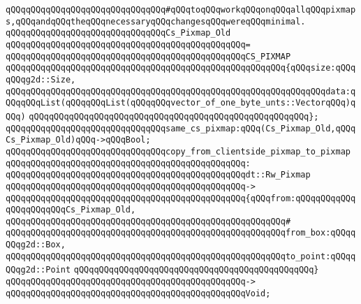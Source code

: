 \verb|qQQqqQQqqQQqqQQqqQQqqQQqqQQqqQQq#qQQqtoqQQqworkqQQqonqQQqallqQQqpixmaps,qQQqandqQQqtheqQQqnecessaryqQQqchangesqQQqwereqQQqminimal.|\newline
\newline
\newline
\verb|qQQqqQQqqQQqqQQqqQQqqQQqqQQqqQQqCs_Pixmap_Old|\newline
\verb|qQQqqQQqqQQqqQQqqQQqqQQqqQQqqQQqqQQqqQQqqQQqqQQq=|\newline
\verb|qQQqqQQqqQQqqQQqqQQqqQQqqQQqqQQqqQQqqQQqqQQqqQQqCS_PIXMAP|\newline
\verb|qQQqqQQqqQQqqQQqqQQqqQQqqQQqqQQqqQQqqQQqqQQqqQQqqQQqqQQq{qQQqsize:qQQqqQQqg2d::Size,|\newline
\verb|qQQqqQQqqQQqqQQqqQQqqQQqqQQqqQQqqQQqqQQqqQQqqQQqqQQqqQQqqQQqqQQqdata:qQQqqQQqList(qQQqqQQqList(qQQqqQQqvector_of_one_byte_unts::VectorqQQq)qQQq)|\newline
\verb|qQQqqQQqqQQqqQQqqQQqqQQqqQQqqQQqqQQqqQQqqQQqqQQqqQQqqQQq};|\newline
\newline
\verb|qQQqqQQqqQQqqQQqqQQqqQQqqQQqqQQqsame_cs_pixmap:qQQq(Cs_Pixmap_Old,qQQqCs_Pixmap_Old)qQQq->qQQqBool;|\newline
\newline
\verb|qQQqqQQqqQQqqQQqqQQqqQQqqQQqqQQqcopy_from_clientside_pixmap_to_pixmap|\newline
\verb|qQQqqQQqqQQqqQQqqQQqqQQqqQQqqQQqqQQqqQQqqQQqqQQq:|\newline
\verb|qQQqqQQqqQQqqQQqqQQqqQQqqQQqqQQqqQQqqQQqqQQqqQQqdt::Rw_Pixmap|\newline
\verb|qQQqqQQqqQQqqQQqqQQqqQQqqQQqqQQqqQQqqQQqqQQqqQQq->|\newline
\verb|qQQqqQQqqQQqqQQqqQQqqQQqqQQqqQQqqQQqqQQqqQQqqQQq{qQQqfrom:qQQqqQQqqQQqqQQqqQQqqQQqCs_Pixmap_Old,|\newline
\verb|qQQqqQQqqQQqqQQqqQQqqQQqqQQqqQQqqQQqqQQqqQQqqQQqqQQqqQQq#|\newline
\verb|qQQqqQQqqQQqqQQqqQQqqQQqqQQqqQQqqQQqqQQqqQQqqQQqqQQqqQQqfrom_box:qQQqqQQqg2d::Box,|\newline
\verb|qQQqqQQqqQQqqQQqqQQqqQQqqQQqqQQqqQQqqQQqqQQqqQQqqQQqqQQqto_point:qQQqqQQqg2d::Point|\newline
\verb|qQQqqQQqqQQqqQQqqQQqqQQqqQQqqQQqqQQqqQQqqQQqqQQq}|\newline
\verb|qQQqqQQqqQQqqQQqqQQqqQQqqQQqqQQqqQQqqQQqqQQqqQQq->|\newline
\verb|qQQqqQQqqQQqqQQqqQQqqQQqqQQqqQQqqQQqqQQqqQQqqQQqVoid;|\newline
